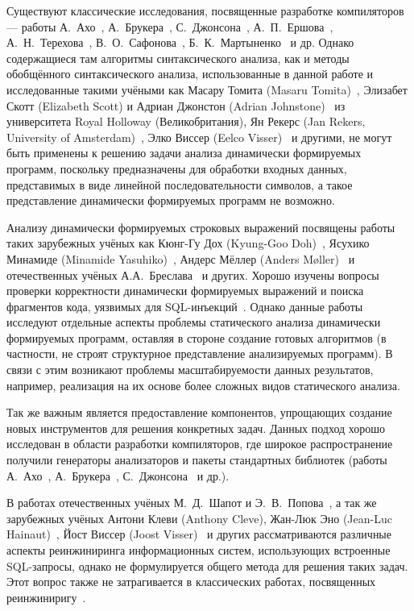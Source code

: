 Существуют классические исследования, посвященные разработке компиляторов --- работы А.~Ахо~\cite{Dragon}, А.~Брукера~\cite{CompilerCompiler}, С.~Джонсона~\cite{yaccBook}, А.~П.~Ершова~\cite{Ershov1,Ershov2},   А.~Н.~Терехова~\cite{ANTCompiler}, В.~О.~Сафонова~\cite{safonov}, Б.~К.~Мартыненко~\cite{Martinenko1, Martinenko2}  и др.  Однако содержащиеся там алгоритмы синтаксического анализа, как и методы обобщённого синтаксического анализа, использованные в данной работе и исследованные такими учёными как Масару Томита (Masaru Tomita)~\cite{Tomita}, Элизабет Скотт (Elizabeth Scott) и Адриан Джонстон (Adrian Johnstone)~\cite{RNGLR,RIGLR} из университета Royal Holloway (Великобритания), Ян Рекерс (Jan Rekers, University of Amsterdam)~\cite{SPPF}, Элко Виссер (Eelco Visser)~\cite{RNGLRSyntaxerror2,RNGLRSyntaxerror3} и другими, не могут быть применены к решению задачи анализа динамически формируемых программ, поскольку предназначены для обработки входных данных, представимых в виде линейной последовательности символов, а такое представление динамически формируемых программ не возможно.

Анализу динамически формируемых строковых выражений посвящены работы таких зарубежных учёных как Кюнг-Гу Дох (Kyung-Goo Doh)~\cite{LrAbstract1,LrAbstract2,LRAbstractParsingSema}, Ясухико Минамиде (Minamide Yasuhiko)~\cite{PHPSA}, Андерс Мёллер (Anders M{\o}ller)~\cite{JSA} и отечественных учёных А.А.~Бреслава~\cite{Alvor1,Alvor2} и других. Хорошо изучены вопросы проверки корректности динамически формируемых выражений и поиска фрагментов кода, уязвимых для SQL-инъекций~\cite{SQLInjection,Dasgupta:2009:SAF:1546683.1547548}. Однако данные работы исследуют отдельные аспекты проблемы статического анализа динамически формируемых программ, оставляя в стороне создание готовых алгоритмов (в частности, не строят структурное представление анализируемых программ). В связи с этим возникают проблемы масштабируемости данных результатов, например, реализация на их основе более сложных видов статического анализа.

Так же важным является предоставление компонентов, упрощающих создание новых инструментов для решения конкретных задач. Данных подход хорошо исследован в области разработки компиляторов, где широкое распространение получили генераторы анализаторов и пакеты стандартных библиотек (работы А.~Ахо~\cite{Dragon}, А.~Брукера~\cite{CompilerCompiler}, С.~Джонсона~\cite{yaccBook} и др.). 

В работах отечественных учёных М.~Д.~Шапот и Э.~В.~Попова~\cite{DynamicDSQLTranslation}, а так же зарубежных учёных Антони Клеви (Anthony Cleve), Жан-Люк Эно (Jean-Luc Hainaut)~\cite{DSQLReverseEngineering}, Йост Виссер (Joost Visser)~\cite{DSQLQualityMesure} и других рассматриваются различные аспекты реинжиниринга информационных систем, использующих встроенные SQL-запросы, однако не формулируется общего метода для решения таких задач. Этот вопрос также не затрагивается в классических работах, посвященных реинжиниригу~\cite{SoftwareReeng1, reengANT, SoftwareReeng2, SoftwareReeng3}.

